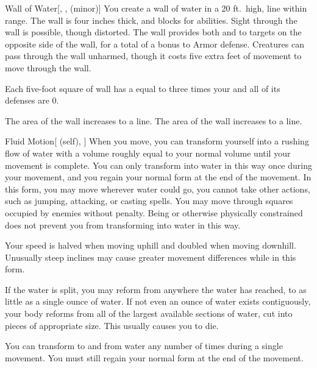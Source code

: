 \lowercase{\hypertarget{spell:Wall of Water}{}}\label{spell:Wall of Water}
\begin{freeability}[Rank 4]{\hypertarget{spell:Wall of Water}{Wall of Water}}[, ,  (minor)]
\targetrule
You create a wall of water in a 20 ft.\ high, \arealarge line within \rngmed range.
The wall is four inches thick, and blocks  for abilities.
Sight through the wall is possible, though distorted.
The wall provides both  and  to targets on the opposite side of the wall, for a total of a  bonus to Armor defense.
Creatures can pass through the wall unharmed, though it costs five extra feet of movement to move through the wall.

Each five-foot square of wall has a  equal to three times your  and all of its defenses are 0.

\rankline
{} The area of the wall increases to a \areahuge line.
 The area of the wall increases to a \areaext line.

\end{freeability}
\vspace{0.25em}



\lowercase{\hypertarget{spell:Fluid Motion}{}}\label{spell:Fluid Motion}
\begin{attuneability}[Rank 5]{\hypertarget{spell:Fluid Motion}{Fluid Motion}}[ (self), ]
When you move, you can transform yourself into a rushing flow of water with a volume roughly equal to your normal volume until your movement is complete.
You can only transform into water in this way once during your movement, and you regain your normal form at the end of the movement.
In this form, you may move wherever water could go, you cannot take other actions, such as jumping, attacking, or casting spells.
You may move through squares occupied by enemies without penalty.
Being  or otherwise physically constrained does not prevent you from transforming into water in this way.

Your speed is halved when moving uphill and doubled when moving downhill.
Unusually steep inclines may cause greater movement differences while in this form.

If the water is split, you may reform from anywhere the water has reached, to as little as a single ounce of water.
If not even an ounce of water exists contiguously, your body reforms from all of the largest available sections of water, cut into pieces of appropriate size.
This usually causes you to die.

\rankline
{} You can transform to and from water any number of times during a single movement.
You must still regain your normal form at the end of the movement.

\end{attuneability}
\vspace{0.25em}



